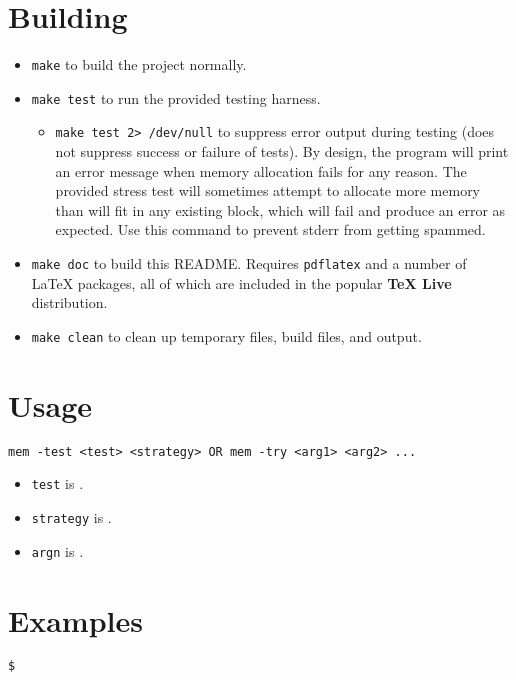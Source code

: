 \documentclass[paper=a4, fontsize=11pt]{scrartcl}
\begin{document}
\section*{Building}
\begin{itemize}
  \item \texttt{make} to build the project normally.

  \item \texttt{make test} to run the provided testing harness.
  \begin{itemize}
    \item \texttt{make test 2> /dev/null} to suppress error output during testing (does not suppress success or failure of tests). By design, the program will print an error message when memory allocation fails for any reason. The provided stress test will sometimes attempt to allocate more memory than will fit in any existing block, which will fail and produce an error as expected. Use this command to prevent stderr from getting spammed.
  \end{itemize}

  \item \texttt{make doc} to build this README. Requires \texttt{pdflatex} and a number of \LaTeX\hspace{0em} packages, all of which are included in the popular \textbf{TeX Live} distribution.

  \item \texttt{make clean} to clean up temporary files, build files, and output.
\end{itemize} 

\section*{Usage}
\texttt{mem -test <test> <strategy> OR mem -try <arg1> <arg2> ...}

\begin{itemize}
  \item \texttt{test} is .

  \item \texttt{strategy} is .

  \item \texttt{argn} is .
\end{itemize}


\section*{Examples}
\begin{lstlisting}[style=ShellStyle]$
\end{lstlisting}
\end{document}
